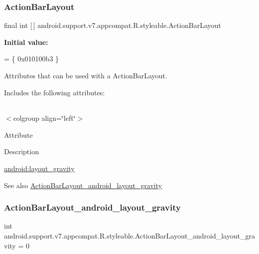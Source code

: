 \subsubsection{\texorpdfstring{Action\+Bar\+Layout}{ActionBarLayout}}
{\footnotesize\ttfamily final int \mbox{[}$\,$\mbox{]} android.\+support.\+v7.\+appcompat.\+R.\+styleable.\+Action\+Bar\+Layout\hspace{0.3cm}{\ttfamily [static]}}

{\bfseries Initial value\+:}
\begin{DoxyCode}
= \{
            0x010100b3
        \}
\end{DoxyCode}
Attributes that can be used with a Action\+Bar\+Layout. 

Includes the following attributes\+:

\tabulinesep=1mm
\begin{longtabu} spread 0pt [c]{*{0}{|X[-1]}|}
\hline
\end{longtabu}
$<$colgroup align=\char`\"{}left\char`\"{}$>$ 

Attribute

Description 

{\ttfamily \hyperlink{classandroid_1_1support_1_1v7_1_1appcompat_1_1R_1_1styleable_a314f35428b4b4dd4548b93494d5b997e}{android\+:layout\+\_\+gravity}}

\begin{DoxySeeAlso}{See also}
\hyperlink{classandroid_1_1support_1_1v7_1_1appcompat_1_1R_1_1styleable_a314f35428b4b4dd4548b93494d5b997e}{Action\+Bar\+Layout\+\_\+android\+\_\+layout\+\_\+gravity} 
\end{DoxySeeAlso}
\mbox{\label{classandroid_1_1support_1_1v7_1_1appcompat_1_1R_1_1styleable_a314f35428b4b4dd4548b93494d5b997e}} 
\subsubsection{\texorpdfstring{Action\+Bar\+Layout\+\_\+android\+\_\+layout\+\_\+gravity}{ActionBarLayout\_android\_layout\_gravity}}
{\footnotesize\ttfamily int android.\+support.\+v7.\+appcompat.\+R.\+styleable.\+Action\+Bar\+Layout\+\_\+android\+\_\+layout\+\_\+gravity = 0\hspace{0.3cm}{\ttfamily [static]}}

